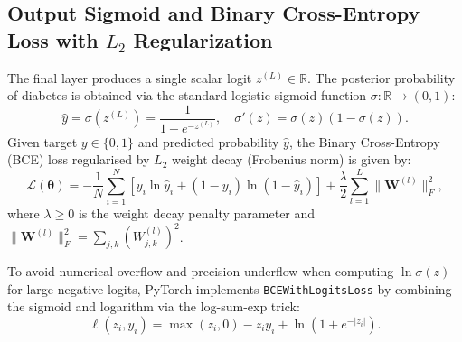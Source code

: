 \documentclass[11pt,a4paper]{article}
\begin{document}
\subsection{Output Sigmoid and Binary Cross-Entropy Loss with $L_2$ Regularization}
The final layer produces a single scalar logit $z^{(L)} \in \mathbb{R}$. The posterior probability of diabetes is obtained via the standard logistic sigmoid function $\sigma: \mathbb{R} \to (0, 1)$:
\begin{equation}
    \hat{y} = \sigma(z^{(L)}) = \frac{1}{1 + e^{-z^{(L)}}}, \quad 
    \sigma'(z) = \sigma(z)(1 - \sigma(z)).
\end{equation}
Given target $y \in \{0, 1\}$ and predicted probability $\hat{y}$, the Binary Cross-Entropy (BCE) loss regularised by $L_2$ weight decay (Frobenius norm) is given by:
\begin{equation}
    \mathcal{L}(\boldsymbol{\theta}) = -\frac{1}{N} \sum_{i=1}^N \left[ y_i \ln \hat{y}_i + (1 - y_i) \ln(1 - \hat{y}_i) \right] + \frac{\lambda}{2} \sum_{l=1}^L \|\mathbf{W}^{(l)}\|_F^2,
    \label{eq:bce_loss}
\end{equation}
where $\lambda \geq 0$ is the weight decay penalty parameter and $\|\mathbf{W}^{(l)}\|_F^2 = \sum_{j,k} (W_{j,k}^{(l)})^2$.

To avoid numerical overflow and precision underflow when computing $\ln \sigma(z)$ for large negative logits, PyTorch implements \texttt{BCEWithLogitsLoss} by combining the sigmoid and logarithm via the log-sum-exp trick:
\begin{equation}
    \ell(z_i, y_i) = \max(z_i, 0) - z_i y_i + \ln\left(1 + e^{-|z_i|}\right).
\end{equation}
\end{document}

